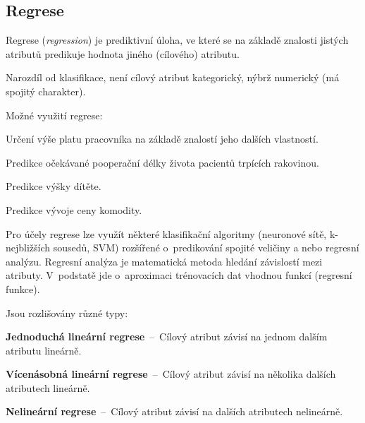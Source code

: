 \subsection{Regrese}

\begin{compactitem}
    \item Regrese (\textit{regression}) je prediktivní úloha, ve které se na základě znalosti jistých atributů predikuje hodnota jiného (cílového) atributu.
    \item Narozdíl od klasifikace, není cílový atribut kategorický, nýbrž numerický (má spojitý charakter). \item Možné využití regrese: \begin{compactitem}
        \item Určení výše platu pracovníka na základě znalostí jeho dalších vlastností.

        \item Predikce očekávané pooperační délky života pacientů trpících rakovinou.

        \item Predikce výšky dítěte.

        \item Predikce vývoje ceny komodity.
    \end{compactitem}

    \item Pro účely regrese lze využít některé klasifikační algoritmy (neuronové sítě, k-nejbli\-žších sousedů, SVM) rozšířené o~predikování spojité veličiny a nebo regresní analýzu. Regresní analýza je matematická metoda hledání závislostí mezi atributy. V~podstatě jde o~aproximaci trénovacích dat vhodnou funkcí (regresní funkce).

    \item Jsou rozlišovány různé typy: \begin{compactitem}
        \item \textbf{Jednoduchá lineární regrese}~--~Cílový atribut závisí na jednom dalším atributu lineárně.

        \item \textbf{Vícenásobná lineární regrese}~--~Cílový atribut závisí na několika dalších atributech lineárně.

        \item \textbf{Nelineární regrese}~--~Cílový atribut závisí na dalších atributech nelineárně.
    \end{compactitem}
\end{compactitem}

